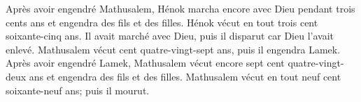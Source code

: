 Après avoir engendré Mathusalem,
	Hénok marcha encore avec Dieu pendant trois cents ans
	et engendra des fils et des filles.
Hénok vécut en tout trois cent soixante-cinq ans.
Il avait marché avec Dieu, puis il disparut car Dieu l’avait enlevé.
Mathusalem vécut cent quatre-vingt-sept ans, puis il engendra Lamek.
Après avoir engendré Lamek,
	Mathusalem vécut encore sept cent quatre-vingt-deux ans
	et engendra des fils et des filles.
Mathusalem vécut en tout neuf cent soixante-neuf ans; puis il mourut.
